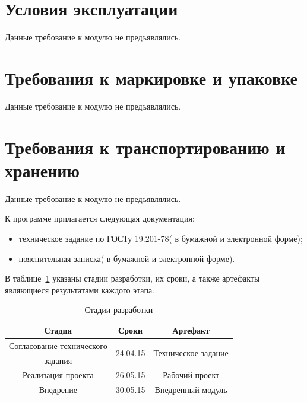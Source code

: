 \documentclass[a4paper,english]{G2-105}
\begin{document}
\section{Условия эксплуатации}

\par Данные требование к модулю не предъявлялись.

\section{Требования к маркировке и упаковке}

\par Данные требование к модулю не предъявлялись.

\section{Требования к транспортированию и хранению}

\par Данные требование к модулю не предъявлялись.


К программе прилагается следующая документация:
\begin{itemize}
    \item техническое задание по ГОСТу 19.201-78( в бумажной и электронной форме);
    \item пояснительная записка( в бумажной и электронной форме).
\end{itemize}


\par В таблице~\ref{stages} указаны стадии разработки, их сроки, а также артефакты являющиеся результатами каждого этапа.
\begin{longtable}{|c|c|c|}
    \caption{Стадии разработки} \label{stages} \\ \hline
    Стадия                    & Сроки                     & Артефакт \\ \hline \endhead
    Согласование технического &\multirow{2}{*}{ 24.04.15} & \multirow{2}{*}{Техническое задание} \\ 
    задания                   &                           &                    \\ \hline        
    Реализация проекта        & 26.05.15                  & Рабочий проект \\ \hline
    Внедрение                 & 30.05.15                  & Внедренный модуль \\  
\end{longtable}
\ttl \ttl
{}
\end{document}
